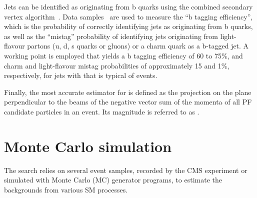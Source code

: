 
Jets can be identified as originating from b quarks using the combined
secondary vertex algorithm~\cite{Chatrchyan:2012jua}. Data
samples~\cite{CMS-PAS-BTV-15-001} are used to measure the ``b tagging
efficiency'', which is the probability of correctly identifying jets
as originating from b quarks, as well as the ``mistag'' probability of
identifying jets originating from light-flavour partons (u, d, s
quarks or gluons) or a charm quark as a b-tagged jet. A working point
is employed that yields a b tagging efficiency of 60 to 75\%, and
charm and light-flavour mistag probabilities of approximately 15 and
1\%, respectively, for jets with \pt that is typical of \ttbar events.

Finally, the most accurate estimator for \ptvecmiss is defined as the
projection on the plane perpendicular to the beams of the negative
vector sum of the momenta of all PF candidate particles in an
event. Its magnitude is referred to as \ptmiss.


\section{Monte Carlo simulation}
\label{sec:simulation}

The search relies on several event samples, recorded by the CMS
experiment or simulated with Monte Carlo (MC) generator programs, to
estimate the backgrounds from various SM processes.

